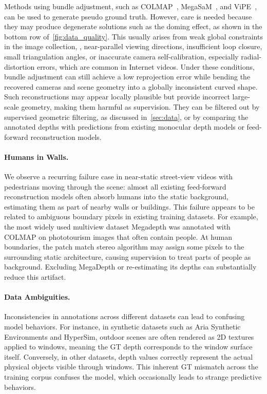 Methods using bundle adjustment, such as COLMAP~\cite{schonberger16structure-from-motion}, MegaSaM~\cite{li25megasam:}, and ViPE~\cite{huang25vipe:}, can be used to generate pseudo ground truth.
However, care is needed because they may produce degenerate solutions such as the doming effect, as shown in the bottom row of~\cref{fig:data_quality}.
This usually arises from weak global constraints in the image collection, \eg, near-parallel viewing directions, insufficient loop closure, small triangulation angles, or inaccurate camera self-calibration, especially radial-distortion errors, which are common in Internet videos.
Under these conditions, bundle adjustment can still achieve a low reprojection error while bending the recovered cameras and scene geometry into a globally inconsistent curved shape.
Such reconstructions may appear locally plausible but provide incorrect large-scale geometry, making them harmful as supervision.
They can be filtered out by supervised geometric filtering, as discussed in~\cref{sec:data}, or by comparing the annotated depths with predictions from existing monocular depth models or feed-forward reconstruction models.

\paragraph{Humans in Walls.}

We observe a recurring failure case in near-static street-view videos with pedestrians moving through the scene: almost all existing feed-forward reconstruction models often absorb humans into the static background, estimating them as part of nearby walls or buildings.
This failure appears to be related to ambiguous boundary pixels in existing training datasets.
For example, the most widely used multiview dataset Megadepth was annotated with COLMAP on phototourism images that often contain people.
At human boundaries, the patch match stereo algorithm may assign some pixels to the surrounding static architecture, causing supervision to treat parts of people as background.
Excluding MegaDepth or re-estimating its depths can substantially reduce this artifact.

\paragraph{Data Ambiguities.}

Inconsistencies in annotations across different datasets can lead to confusing model behaviors.
For instance, in synthetic datasets such as Aria Synthetic Environments and HyperSim, outdoor scenes are often rendered as 2D textures applied to windows, meaning the GT depth corresponds to the window surface itself.
Conversely, in other datasets, depth values correctly represent the actual physical objects visible through windows.
This inherent GT mismatch across the training corpus confuses the model, which occasionally leads to strange predictive behaviors.

